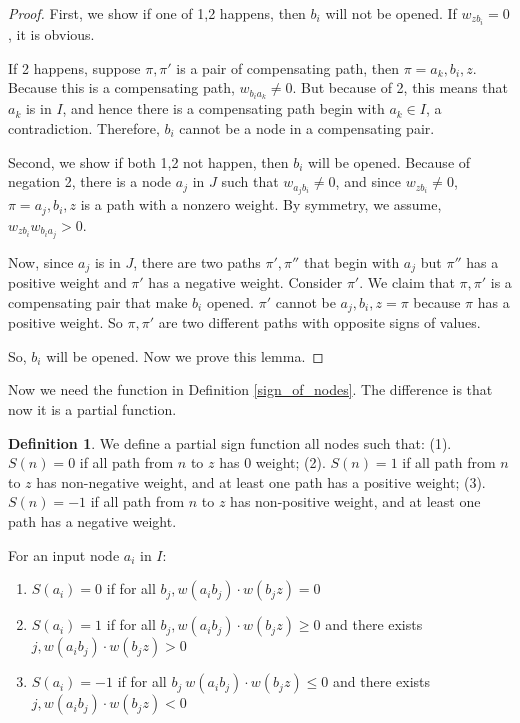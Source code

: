 \documentclass[]{article}
\theoremstyle{definition}
\newtheorem{definition}{Definition}
\begin{document}
\begin{proof}
	First, we show if one of 1,2 happens, then $b_i$ will not be opened. If $w_{zb_i}=0$, it is obvious.
	
	If 2 happens, suppose $\pi,\pi'$ is a pair of compensating path, then $\pi = a_k,b_i,z$. Because this is a compensating path, $w_{b_ia_k}\neq 0$. But because of 2, this means that $a_k$ is in $I$, and hence there is a compensating path begin with $a_k\in I$, a contradiction. Therefore, $b_i$ cannot be a node in a compensating pair.
	
	Second, we show if both 1,2 not happen, then $b_i$ will be opened. Because of negation 2, there is a node $a_j$ in $J$ such that $w_{a_jb_i}\neq 0$, and since $w_{zb_i}\neq 0$, $\pi=a_j,b_i,z$ is a path with a  nonzero weight. By symmetry, we assume, $w_{zb_i}w_{b_ia_j}>0$. 
	
	Now, since $a_j$ is in $J$, there are two paths $\pi',\pi''$ that begin with $a_j$ but $\pi''$ has a positive weight and $\pi'$ has a negative weight. Consider $\pi'$. We claim that $\pi,\pi'$ is a compensating pair that make $b_i$ opened. $\pi'$ cannot be $a_j,b_i,z=\pi$ because $\pi$ has a positive weight. So $\pi,\pi'$ are two different paths with opposite signs of values.
	
	So, $b_i$ will be opened. Now we prove this lemma. 
\end{proof}


Now we need the function in Definition \ref{sign_of_nodes}. The difference is that now it is a partial function.

\begin{definition}\label{sign_of_nodes_in_I}
	We define a partial sign function all nodes such that: 	(1). $S(n)=0$ if all path from $n$ to $z$ has 0 weight; (2). $S(n)=1$ if all path from $n$ to $z$ has non-negative weight, and at least one path has a positive weight; (3). $S(n)=-1$ if all path from $n$ to $z$ has non-positive weight, and at least one path has a negative weight. 
	
	
	For an input node $a_i$ in $I$:
	\begin{enumerate}
		\item  $S(a_i)=0$ if 
		for all $b_j, w(a_i b_j)\cdot w(b_j z) = 0$
		
		
		\item  $S(a_i)=1$ if for all $b_j, w(a_i b_j)\cdot w(b_j z) \geq 0$ and there exists 
		$j, w(a_i b_j)\cdot w(b_j z) > 0$
		
		\item $S(a_i)=-1$ if for all $b_j\ w(a_i b_j)\cdot w(b_j z) \leq 0$ and there exists 
		$j, w(a_i b_j)\cdot w(b_j z) < 0$ 
	\end{enumerate}
\end{definition}
\end{document}
